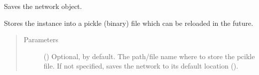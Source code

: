 \documentclass[letterpaper,10pt,english]{sphinxmanual}
\begin{document}
\begin{fulllineitems}

\begin{fulllineitems}
\label{\detokenize{main:pypath.main.PyPath.reload}}
\end{fulllineitems}


\begin{fulllineitems}
\label{\detokenize{main:pypath.main.PyPath.remove_htp}}
\end{fulllineitems}


\begin{fulllineitems}
\label{\detokenize{main:pypath.main.PyPath.remove_undirected}}
\end{fulllineitems}


\begin{fulllineitems}
\label{\detokenize{main:pypath.main.PyPath.run_batch}}
\end{fulllineitems}


\begin{fulllineitems}
\label{\detokenize{main:pypath.main.PyPath.save_network}}
Saves the network object.

Stores the instance into a pickle (binary) file which can be
reloaded in the future.
\begin{quote}\begin{description}
\item[{Parameters}] \leavevmode
{} () \textendash{} Optional,  by default. The path/file name where to
store the pcikle file. If not specified, saves the network
to its default location
().


\end{description}
\end{quote}
\end{fulllineitems}
\end{fulllineitems}
\end{document}
